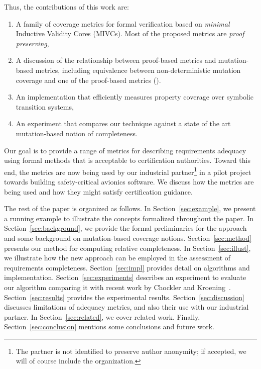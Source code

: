 Thus, the contributions of this work are:
\begin{enumerate}
\item A family of coverage metrics for formal verification based on \emph{minimal} Inductive Validity Cores (MIVCs).  Most of the proposed metrics are {\em proof preserving},
\item A discussion of the relationship between proof-based metrics and mutation-based metrics, including equivalence between non-deterministic mutation coverage and one of the proof-based metrics (\mustcov).
\item An implementation that efficiently measures property coverage over symbolic transition systems,
\item An experiment that compares our technique against a state of the art mutation-based notion of completeness.
\end{enumerate}

\noindent Our goal is to provide a range of metrics for describing requirements adequacy using formal methods that is acceptable to certification authorities.  Toward this end, the metrics are now being used by our industrial partner\footnote{The partner is not identified to preserve author anonymity; if accepted, we will of course include the organization.} in a pilot project towards building safety-critical avionics software.  We discuss how the metrics are being used and how they might satisfy certification guidance.



The rest of the paper is organized as follows.  In Section~\ref{sec:example}, we present a running example to illustrate the concepts formalized throughout the paper.  In Section~\ref{sec:background}, we provide the formal preliminaries for the approach and some background on mutation-based coverage notions.  Section~\ref{sec:method} presents our method for computing relative completeness.
In Section~\ref{sec:illust}, we illustrate how the new approach can be employed in the assessment of requirements completeness.
Section~\ref{sec:impl} provides detail on algorithms and implementation. Section~\ref{sec:experiments} describes an experiment to evaluate our algorithm comparing it with recent work by Chockler and Kroening~\cite{chockler2010coverage}.
Section~\ref{sec:results} provides the experimental results. Section~\ref{sec:discussion} discusses limitations of adequacy metrics, and also their use with our industrial partner.  In Section~\ref{sec:related}, we cover related work.  Finally, Section~\ref{sec:conclusion} mentions some conclusions and future work.

